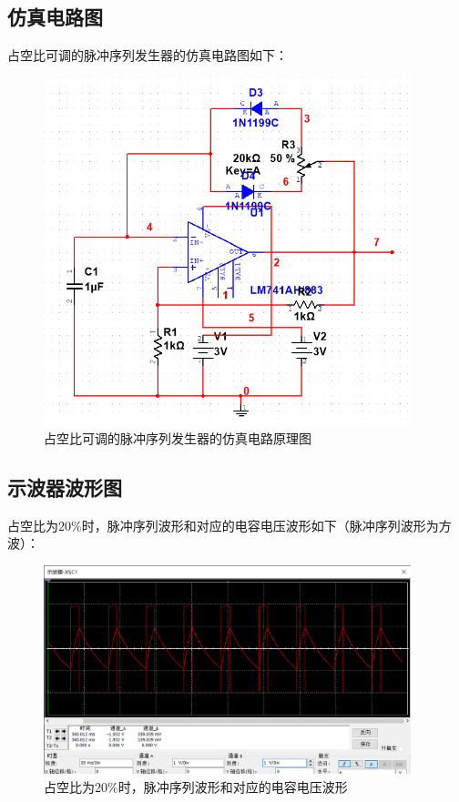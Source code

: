 \documentclass[UTF8]{ctexart}
\begin{document}
\subsection{仿真电路图}
占空比可调的脉冲序列发生器的仿真电路图如下：
\begin{figure}[H]
\centering
\includegraphics[width=0.95\textwidth]{B.png}
\caption{占空比可调的脉冲序列发生器的仿真电路原理图}
\end{figure}

\subsection{示波器波形图}
占空比为$20\%$时，脉冲序列波形和对应的电容电压波形如下（脉冲序列波形为方波）：
\begin{figure}[H]
\centering
\includegraphics[width=0.95\textwidth]{CC.png}
\caption{占空比为$20\%$时，脉冲序列波形和对应的电容电压波形}
\end{figure}
\end{document}
